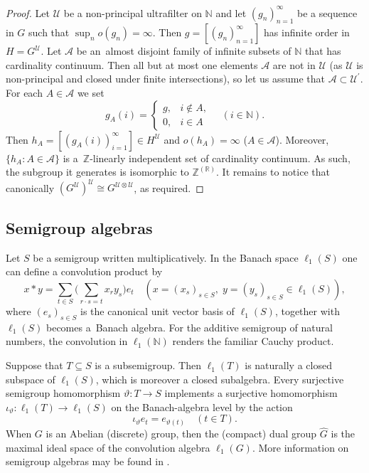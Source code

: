 \documentclass[12pt,fleqn]{amsart}
\theoremstyle{definition}
\numberwithin{equation}{section}
\theoremstyle{remark}
\begin{document}
\begin{proof}
Let $\mathscr{U}$ be a non-principal ultrafilter on $\mathbb N$ and let $(g_n)_{n=1}^\infty$ be a sequence in $G$ such that $\sup_{n}o(g_n) = \infty$. Then $g = [(g_n)_{n=1}^\infty ]$ has infinite order in $H = G^{\mathscr{U}}$. Let $\mathscr{A}$ be an~almost disjoint family of infinite subsets of $\mathbb N$ that has cardinality continuum. Then all but at most one elements $\mathscr{A}$ are not in $\mathscr{U}$ (as $\mathscr{U}$ is non-principal and closed under finite intersections), so let us assume that $\mathscr{A} \subset \mathscr{U}^\prime$. For each $A\in \mathscr{A}$ we set
\[
    g_A(i) = 
                \left\{\begin{array}{ll}
                    g, & i \notin A, \\ 
                    0, & i \in A
                         \end{array}
                            \quad (i\in \mathbb N). \right.
\]
Then $h_A = [(g_A(i))_{i=1}^\infty] \in H^{\mathscr{U}}$ and $o(h_A) = \infty$ ($A\in \mathscr{A}$). Moreover, $\{h_A\colon A\in \mathscr A\}$ is a~$\mathbb Z$-linearly independent set of cardinality continuum. As such, the subgroup it generates is isomorphic to $\mathbb Z^{(\mathbb R)}$. It remains to notice that canonically $(G^{\mathscr{U}})^{\mathscr U} \cong G^{\mathscr{U} \otimes \mathscr{U}}$, as required.
\end{proof}

\subsection{Semigroup algebras}\label{sect:semigroup}
Let $S$ be a semigroup written multiplicatively. In the Banach space $\ell_1(S)$ one can define a convolution product by
\[
    x\ast y =\sum_{t\in S} \Big(\sum_{r\cdot s=t}x_r y_s\Big)e_t \quad (x = (x_s)_{s\in S},\; y = (y_s)_{s\in S}\in \ell_1(S)),
\]
where $(e_s)_{s\in S}$ is the canonical unit vector basis of $\ell_1(S)$, together with $\ell_1(S)$ becomes a~Banach algebra. For the additive semigroup of natural numbers, the convolution in $\ell_1(\mathbb N)$ renders the familiar Cauchy product.

Suppose that $T\subseteq S$ is a subsemigroup. Then $\ell_1(T)$ is naturally a closed subspace of $\ell_1(S)$, which is moreover a closed subalgebra. Every surjective semigroup homomorphism $\vartheta\colon T\to S$ implements a surjective homomorphism $\iota_\vartheta\colon \ell_1(T)\to \ell_1(S)$ on the Banach-algebra level by the action 
%
\begin{equation}\label{homomorphismtheta}
    \iota_\vartheta e_t = e_{\vartheta(t)}\quad (t\in T).
\end{equation} 
When $G$ is an Abelian (discrete) group, then the (compact) dual group $\widehat{G}$ is the maximal ideal space of the convolution algebra $\ell_1(G)$. More information on semigroup algebras may be found in \cite[Chapter 4]{dales2012second}. 
\end{document}

